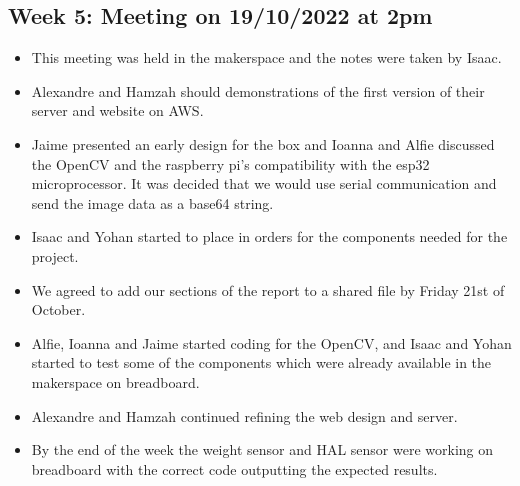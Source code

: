 \subsection{Week 5: Meeting on 19/10/2022 at 2pm }
\begin{itemize}
    \item This meeting was held in the makerspace and the notes were taken by Isaac. 
    \item Alexandre and Hamzah should demonstrations of the first version of their server and website on AWS. 
    \item Jaime presented an early design for the box and Ioanna and Alfie discussed the OpenCV and the raspberry pi's compatibility with the esp32 microprocessor. It was decided that we would use serial communication and send the image data as a base64 string.  
    \item Isaac and Yohan started to place in orders for the components needed for the project.  
    \item We agreed to add our sections of the report to a shared file by Friday 21st of October. 
    \item Alfie, Ioanna and Jaime started coding for the OpenCV, and Isaac and Yohan started to test some of the components which were already available in the makerspace on breadboard. 
    \item Alexandre and Hamzah continued refining the web design and server. 
    \item By the end of the week the weight sensor and HAL sensor were working on breadboard with the correct code outputting the expected results. 
\end{itemize}
   







